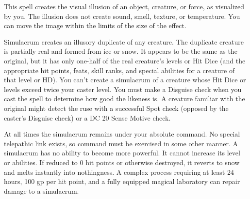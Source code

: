 \begin{multicols}{2}
\begin{small}
\noindent This spell creates the visual illusion of an object, creature, or force, as visualized by you. The illusion does not create sound, smell, texture, or temperature. You can move the image within the limits of the size of the effect.


\noindent Simulacrum creates an illusory duplicate of any creature. The duplicate creature is partially real and formed from ice or snow. It appears to be the same as the original, but it has only one-half of the real creature's levels or Hit Dice (and the appropriate hit points, feats, skill ranks, and special abilities for a creature of that level or HD). You can't create a simulacrum of a creature whose Hit Dice or levels exceed twice your caster level. You must make a Disguise check when you cast the spell to determine how good the likeness is. A creature familiar with the original might detect the ruse with a successful Spot check (opposed by the caster's Disguise check) or a DC 20 Sense Motive check.

\smallskip\noindent At all times the simulacrum remains under your absolute command. No special telepathic link exists, so command must be exercised in some other manner. A simulacrum has no ability to become more powerful. It cannot increase its level or abilities. If reduced to 0 hit points or otherwise destroyed, it reverts to snow and melts instantly into nothingness. A complex process requiring at least 24 hours, 100 gp per hit point, and a fully equipped magical laboratory can repair damage to a simulacrum.



\end{small}
\end{multicols}
